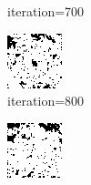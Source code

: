 \documentclass{article}
\begin{document}
\begin{figure}[h]
\begin{subfigure}[t]{0.18\textwidth}
\vspace{-0.6cm}
\caption{iteration=700}
\end{subfigure}\hspace{0.01\textwidth}
\begin{subfigure}[t]{0.18\textwidth}
\centering
\includegraphics[width=\textwidth]{./computational/results/gibbs_comb_sampler_positive_iter_800.png}
\vspace{-0.6cm}
\caption{iteration=800}
\end{subfigure}\hspace{0.01\textwidth}
\begin{subfigure}[t]{0.18\textwidth}
\centering
\includegraphics[width=\textwidth]{./computational/results/gibbs_comb_sampler_positive_iter_900.png}

\end{subfigure}
\end{figure}
\end{document}

